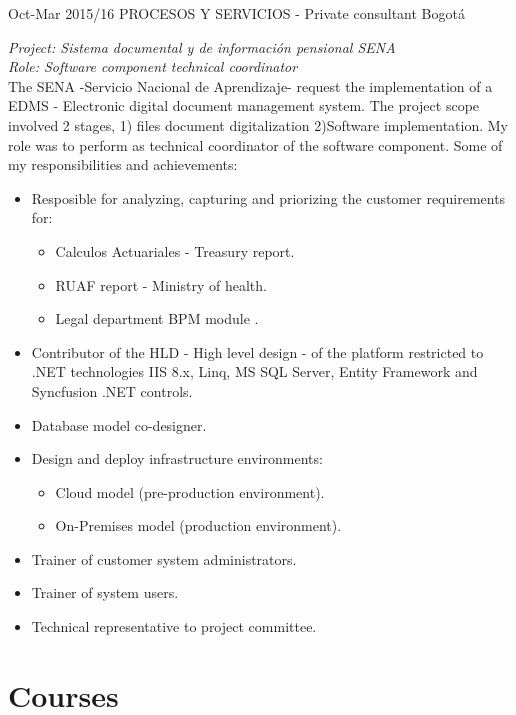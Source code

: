 \documentclass[]{friggeri-cv} %
\begin{document}
\begin{entrylist}
\begin{entrylist}
\entry
{Oct-Mar 2015/16}
{PROCESOS Y SERVICIOS - Private consultant}
{Bogotá}
{\emph{Project: Sistema documental y de información pensional SENA} \\
\emph{Role: Software component technical coordinator} \\
The SENA -Servicio Nacional de Aprendizaje- request the implementation of a EDMS - Electronic digital document management system. The project scope involved 2 stages, 1) files document digitalization 2)Software implementation. My role was to perform as technical coordinator of the software component. Some of my responsibilities and achievements:
\begin{itemize}
\item Resposible for analyzing, capturing and priorizing the customer requirements for:
\begin{itemize}
\item Calculos Actuariales - Treasury report.
\item RUAF report - Ministry of health.
\item Legal department BPM module .
\end{itemize}
\item Contributor of the HLD - High level design - of the platform restricted to .NET technologies IIS 8.x, Linq, MS SQL Server, Entity Framework and Syncfusion .NET controls.
\item Database model co-designer.
\item Design and deploy infrastructure environments:
\begin{itemize}
\item Cloud model (pre-production environment).
\item On-Premises model (production environment).
\end{itemize}
\item Trainer of customer system administrators.
\item Trainer of system users.
\item Technical representative to project committee.
\end{itemize}

}

\end{entrylist}

\newpage

\section{Courses}

\begin{entrylist}


\end{entrylist}
\end{entrylist}
\end{document}
